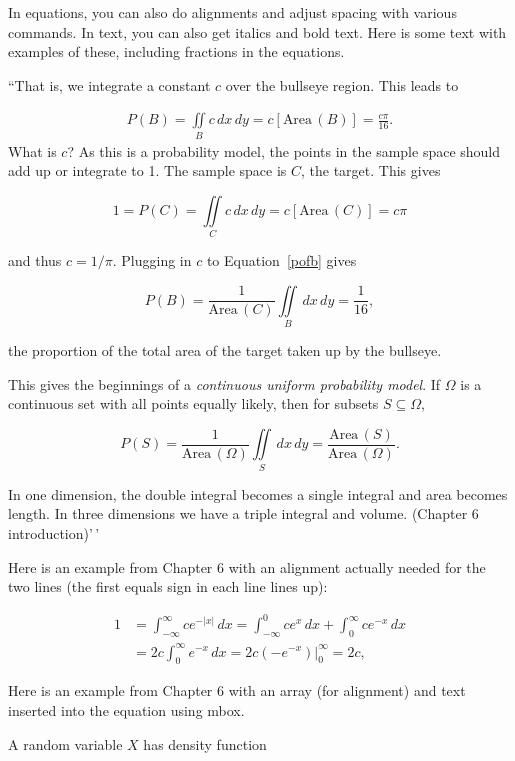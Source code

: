 \documentclass[
  12pt]{article}
\begin{document}
In equations, you can also do alignments and adjust spacing with various
commands. In text, you can also get italics and bold text. Here is some
text with examples of these, including fractions in the equations.

``That is, we integrate a constant \(c\) over the bullseye region. This
leads to

\begin{align}
\label{pofb}
P(B) = \iint\limits_B c \, dx \, dy = c \left[  \mbox{Area}\,(B) \right] =  \frac{c \pi}{16}.
\end{align} What is \(c\)? As this is a probability model, the points in
the sample space should add up or integrate to 1. The sample space is
\(C\), the target. This gives

\[
1 = P(C) = \iint\limits_{C} c \, dx \, dy =  c \left[ \mbox{Area}\,(C) \right] =c \pi
\]

and thus \(c = 1/\pi.\) Plugging in \(c\) to Equation~\ref{pofb} gives

\[
P(B) = \frac{1}{\mbox{Area}\,(C)} \iint\limits_B \, dx \, dy = \frac{1}{16},
\]

the proportion of the total area of the target taken up by the bullseye.

This gives the beginnings of a
\emph{continuous uniform probability model}. If \(\Omega\) is a
continuous set with all points equally likely, then for subsets
\(S \subseteq \Omega\),

\[
P(S) = \frac{1}{\mbox{Area}\,(\Omega)} \iint\limits_S \, dx \, dy = \frac{\mbox{Area}\,(S)}{\mbox{Area}\,(\Omega)}.
\]

In one dimension, the double integral becomes a single integral and area
becomes length. In three dimensions we have a triple integral and
volume. (Chapter 6 introduction)'\,'

Here is an example from Chapter 6 with an alignment actually needed for
the two lines (the first equals sign in each line lines up):

\begin{align*}
1 & = \int_{-\infty}^{\infty} ce^{-|x|} \, dx   = \int_{-\infty}^0 c e^x \, dx + \int_0^{\infty} c e^{-x} \, dx \\
&= 2c \int_0^{\infty}  e^{-x} \, dx = 2c \left. (- e^{-x}) \right|_0^{\infty} = 2c,
\end{align*}

Here is an example from Chapter 6 with an array (for alignment) and text
inserted into the equation using mbox.

A random variable \(X\) has density function
\end{document}
